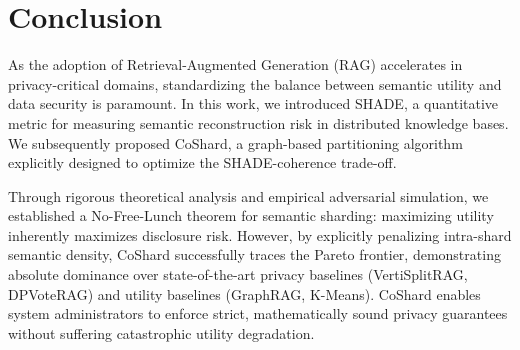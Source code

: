 \section{Conclusion}
As the adoption of Retrieval-Augmented Generation (RAG) accelerates in privacy-critical domains, standardizing the balance between semantic utility and data security is paramount. In this work, we introduced SHADE, a quantitative metric for measuring semantic reconstruction risk in distributed knowledge bases. We subsequently proposed CoShard, a graph-based partitioning algorithm explicitly designed to optimize the SHADE-coherence trade-off. 

Through rigorous theoretical analysis and empirical adversarial simulation, we established a No-Free-Lunch theorem for semantic sharding: maximizing utility inherently maximizes disclosure risk. However, by explicitly penalizing intra-shard semantic density, CoShard successfully traces the Pareto frontier, demonstrating absolute dominance over state-of-the-art privacy baselines (VertiSplitRAG, DPVoteRAG) and utility baselines (GraphRAG, K-Means). CoShard enables system administrators to enforce strict, mathematically sound privacy guarantees without suffering catastrophic utility degradation.
